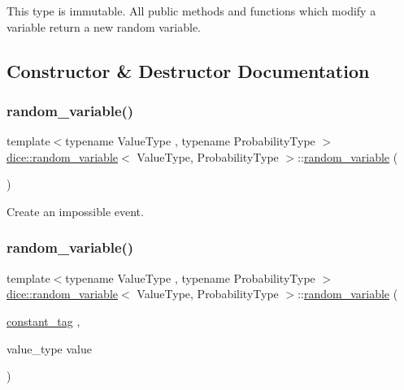 This type is immutable. All public methods and functions which modify a variable return a new random variable. 

\subsection{Constructor \& Destructor Documentation}
\mbox{\label{classdice_1_1random__variable_a7cf5a4706aebdb1d8d1fd362491df895}} 
\subsubsection{\texorpdfstring{random\+\_\+variable()}{random\_variable()}\hspace{0.1cm}{\footnotesize\ttfamily [1/4]}}
{\footnotesize\ttfamily template$<$typename Value\+Type , typename Probability\+Type $>$ \\
\mbox{\hyperlink{classdice_1_1random__variable}{dice\+::random\+\_\+variable}}$<$ Value\+Type, Probability\+Type $>$\+::\mbox{\hyperlink{classdice_1_1random__variable}{random\+\_\+variable}} (\begin{DoxyParamCaption}{ }\end{DoxyParamCaption})\hspace{0.3cm}{\ttfamily [inline]}}



Create an impossible event. 

\mbox{\label{classdice_1_1random__variable_a50f56529bf017dbdc074f98ac6b9ac55}} 
\subsubsection{\texorpdfstring{random\+\_\+variable()}{random\_variable()}\hspace{0.1cm}{\footnotesize\ttfamily [2/4]}}
{\footnotesize\ttfamily template$<$typename Value\+Type , typename Probability\+Type $>$ \\
\mbox{\hyperlink{classdice_1_1random__variable}{dice\+::random\+\_\+variable}}$<$ Value\+Type, Probability\+Type $>$\+::\mbox{\hyperlink{classdice_1_1random__variable}{random\+\_\+variable}} (\begin{DoxyParamCaption}\item[{\mbox{\hyperlink{classdice_1_1constant__tag}{constant\+\_\+tag}}}]{,  }\item[{value\+\_\+type}]{value }\end{DoxyParamCaption})\hspace{0.3cm}{\ttfamily [inline]}}



